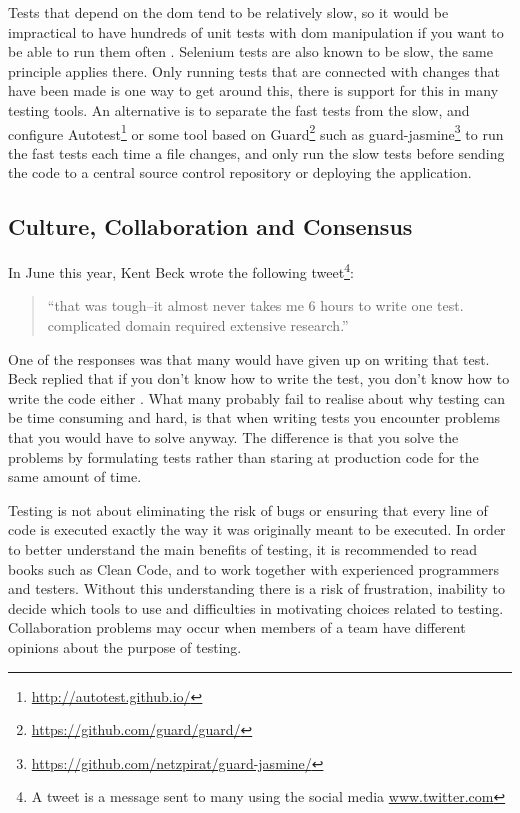 \documentclass[11pt]{article}
\begin{document}
Tests that depend on the \gls{dom} tend to be relatively slow, so it would be impractical to have hundreds of unit tests with \gls{dom} manipulation if you want to be able to run them often \cite[questions~21-22]{Stenmark}. Selenium tests are also known to be slow, the same principle applies there. Only running tests that are connected with changes that have been made is one way to get around this, there is support for this in many testing tools. An alternative is to separate the fast tests from the slow, and configure Autotest\footnote{\url{http://autotest.github.io/}} or some tool based on Guard\footnote{\url{https://github.com/guard/guard/}} such as guard-jasmine\footnote{\url{https://github.com/netzpirat/guard-jasmine/}} to run the fast tests each time a file changes, and only run the slow tests before sending the code to a central source control repository or deploying the application.

\subsection{Culture, Collaboration and Consensus}
\label{subsec:ccc}

In June this year, Kent Beck wrote the following tweet\footnote{A tweet is a message sent to many using the social media \url{www.twitter.com}}:

\begin{quote}
``that was tough--it almost never takes me 6 hours to write one test. complicated domain required extensive research.''
\end{quote}

One of the responses was that many would have given up on writing that test. Beck replied that if you don't know how to write the test, you don't know how to write the code either \cite{TwitterKentBeck}. What many probably fail to realise about why testing can be time consuming and hard, is that when writing tests you encounter problems that you would have to solve anyway. The difference is that you solve the problems by formulating tests rather than staring at production code for the same amount of time. \cite[question~11]{Edelstam}

Testing is not about eliminating the risk of bugs or ensuring that every line of code is executed exactly the way it was originally meant to be executed. In order to better understand the main benefits of testing, it is recommended to read books such as Clean Code\cite{Clean}, and to work together with experienced programmers and testers. Without this understanding there is a risk of frustration, inability to decide which tools to use and difficulties in motivating choices related to testing. Collaboration problems may occur when members of a team have different opinions about the purpose of testing. \cite[question~38]{Edelstam}
\end{document}
